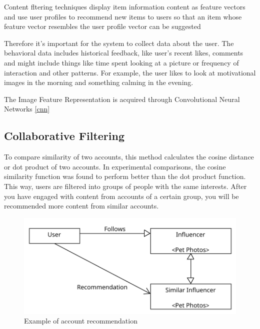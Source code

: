 Content fltering techniques display item information content as feature vectors and use user profiles to recommend new items to users so that an item whose feature vector resembles the user profile vector can be suggested \cite{esvdascfacsasdicars}

Therefore it's important for the system to collect data about the user. The behavioral data includes historical feedback, like user's recent likes, comments and might include things like time spent looking at a picture or frequency of interaction and other patterns. For example, the user likes to look at motivational images in the morning and something calming in the evening.

The Image Feature Representation is acquired through Convolutional Neural Networks \ref{cnn}

\subsection{Collaborative Filtering}\label{applications/collaborative-filtering}

To compare similarity of two accounts, this method calculates the cosine distance or dot product of two accounts. \cite{ig-explore} In experimental comparisons, the cosine similarity function was found to perform better than the dot product function. \cite{10408929} This way, users are filtered into groups of people with the same interests. After you have engaged with content from accounts of a certain group, you will be recommended more content from similar accounts. 

\begin{figure}[H]
    \centering
    \includegraphics[width=1\linewidth]{Diagrams/collaborative-filtering.pdf}
    \caption{Example of account recommendation}
    \label{fig:collaborative-filtering-diagram}
\end{figure}
